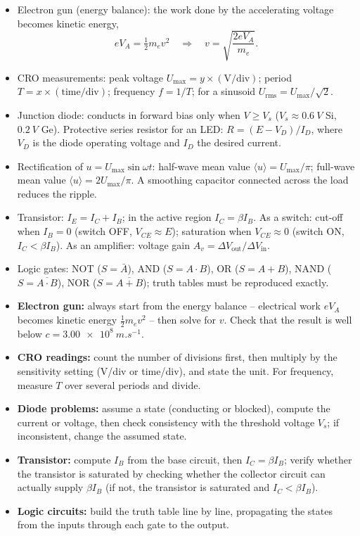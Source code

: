 \documentclass[11pt]{article}
\begin{document}
\begin{aretenir}
\begin{itemize}
\item Electron gun (energy balance): the work done by the accelerating voltage becomes kinetic energy,
\[ eV_A = \tfrac{1}{2}m_e v^2 \quad\Longrightarrow\quad v = \sqrt{\frac{2eV_A}{m_e}}. \]
\item CRO measurements: peak voltage $U_{\max} = y \times (\text{V/div})$; period $T = x \times (\text{time/div})$; frequency $f = 1/T$; for a sinusoid $U_{\text{rms}} = U_{\max}/\sqrt{2}$.
\item Junction diode: conducts in forward bias only when $V \geq V_s$ ($V_s \approx \SI{0.6}{V}$ Si, $\SI{0.2}{V}$ Ge). Protective series resistor for an LED: $R = (E - V_D)/I_D$, where $V_D$ is the diode operating voltage and $I_D$ the desired current.
\item Rectification of $u = U_{\max}\sin\omega t$: half-wave mean value $\langle u \rangle = U_{\max}/\pi$; full-wave mean value $\langle u \rangle = 2U_{\max}/\pi$. A smoothing capacitor connected across the load reduces the ripple.
\item Transistor: $I_E = I_C + I_B$; in the active region $I_C = \beta I_B$. As a switch: cut-off when $I_B = 0$ (switch OFF, $V_{CE}\approx E$); saturation when $V_{CE}\approx 0$ (switch ON, $I_C < \beta I_B$). As an amplifier: voltage gain $A_v = \Delta V_{\text{out}}/\Delta V_{\text{in}}$.
\item Logic gates: NOT ($S=\bar{A}$), AND ($S=A\cdot B$), OR ($S=A+B$), NAND ($S=\overline{A\cdot B}$), NOR ($S=\overline{A+B}$); truth tables must be reproduced exactly.
\end{itemize}
\end{aretenir}

\begin{methode}
\begin{itemize}
\item \textbf{Electron gun:} always start from the energy balance -- electrical work $eV_A$ becomes kinetic energy $\tfrac{1}{2}m_e v^2$ -- then solve for $v$. Check that the result is well below $c = \SI{3.00e8}{m.s^{-1}}$.
\item \textbf{CRO readings:} count the number of divisions first, then multiply by the sensitivity setting (V/div or time/div), and state the unit. For frequency, measure $T$ over several periods and divide.
\item \textbf{Diode problems:} assume a state (conducting or blocked), compute the current or voltage, then check consistency with the threshold voltage $V_s$; if inconsistent, change the assumed state.
\item \textbf{Transistor:} compute $I_B$ from the base circuit, then $I_C = \beta I_B$; verify whether the transistor is saturated by checking whether the collector circuit can actually supply $\beta I_B$ (if not, the transistor is saturated and $I_C < \beta I_B$).
\item \textbf{Logic circuits:} build the truth table line by line, propagating the states from the inputs through each gate to the output.
\end{itemize}
\end{methode}
\end{document}
